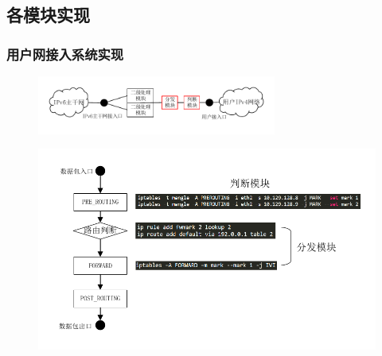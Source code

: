 \documentclass{beamer}
\begin{document}
\subsection{各模块实现}
\begin{frame}
  \frametitle{用户网接入系统实现}
  \vspace{-1em}
  \begin{figure}
    \includegraphics[width=0.7\textwidth]{figs/10-user-access-point-b.pdf}
  \end{figure}
  \vspace{-3em}
  \begin{figure}
    \includegraphics[width=\textwidth]{figs/11-netfilter.pdf}
  \end{figure}
  \vspace{-2em}

\end{frame}
\end{document}
